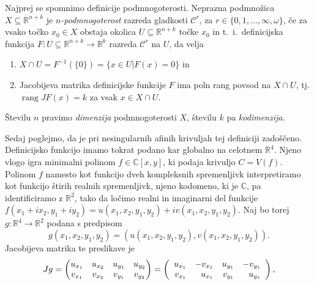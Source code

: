 \documentclass[mat1]{fmfdelo}
\newcommand{\tikzmark}[1]{\tikz[overlay,remember picture,baseline=(#1.base)]
  \node (#1) {\strut};}
\numberwithin{equation}{section}
\newcommand{\R}{\mathbb R}
\newcommand{\C}{\mathbb C}
\DeclareMathOperator{\rang}{rang}
\theoremstyle{definition}
\begin{document}
\begin{dokaz}
    Najprej se spomnimo definicije podmnogoterosti. Neprazna podmnožica $X \subseteq \R^{n+k}$ je \emph{$n$-podmnogoterost} razreda gladkosti $\mathcal{C}^r$, za $r \in \{0,1,\dots, \infty, \omega\}$, če za vsako točko $x_0 \in X$ obstaja okolica $U \subseteq \R^{n+k}$ točke $x_0$ in t.~i.\ definicijska funkcija $F: U \subseteq \R^{n+k} \to \R^k$ razreda $\mathcal{C}^r$ na $U$, da velja
    \begin{enumerate}
        \item $X \cap U = F^{-1}(\{0\}) = \{x \in U | F(x) = 0\}$ in
        \item Jacobijeva matrika definicijske funkcije $F$ ima poln rang povsod na $X \cap U$, tj. $\rang J F(x) = k$ za vsak $x \in X \cap U$.
    \end{enumerate}
    Številu $n$ pravimo \emph{dimenzija} podmnogoterosti $X$, številu $k$ pa \emph{kodimenzija}.
    \\
    \par
    Sedaj poglejmo, da je pri nesingularnih afinih krivuljah tej definiciji zadoščeno. Definicijsko funkcijo imamo tokrat podano kar globalno na celotnem $\R^4$. Njeno vlogo igra minimalni polinom $f \in \C[x,y]$, ki podaja krivuljo $C = V(f)$. Polinom $f$ namesto kot funkcijo dveh kompleksnih spremenljivk interpretiramo kot funkcijo štirih realnih spremenljivk, njeno kodomeno, ki je $\C$, pa identificiramo z $\R^2$, tako da ločimo realni in imaginarni del funkcije $f(x_1 + ix_2, y_1 + iy_2) = u(x_1,x_2,y_1,y_2) + iv(x_1,x_2,y_1,y_2)$. Naj bo torej $g: \R^4 \to \R^2$ podana s predpisom
    \[
        g(x_1,x_2,y_1,y_2) = (u(x_1,x_2,y_1,y_2), v(x_1,x_2,y_1,y_2)).
    \]
    Jacobijeva matrika te preslikave je
    \[
    Jg = 
    \begin{pmatrix}
        u_{x_1} & u_{x_2} & u_{y_1} & u_{y_2} \\
        v_{x_1} & v_{x_2} & v_{y_1} & v_{y_2}
    \end{pmatrix}
    =
    \left (
        \begin{array}{rrrr}
            u_{x_1} & -v_{x_1} & u_{y_1} & -v_{y_1} \\
            \tikzmark{lower1} v_{x_1} & u_{x_1}\tikzmark{lower2} & \tikzmark{lower3} v_{y_1} & u_{y_1} \tikzmark{lower4}\\
        \end{array}
    \right ),
    \]
        

\end{dokaz}
\end{document}
